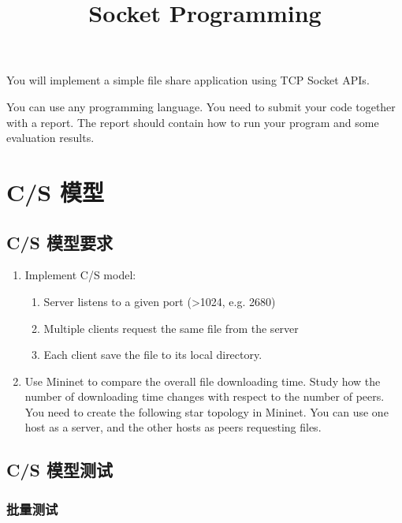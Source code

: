 \endofdump
{}

\title{Socket Programming}
\maketitle
\tableofcontents

\vfill
You will implement a simple file share application using TCP Socket APIs. 

You can use any programming language. You need to submit your code together with a report. The report should contain how to run your program and some evaluation results.
\vfill
\clearpage
\section{C/S 模型}

\subsection{C/S 模型要求}

\begin{enumerate}
    \item Implement C/S model: 
    \begin{enumerate}
        \item Server listens to a given port (>1024, e.g. 2680)
        \item Multiple clients request the same file from the server
        \item Each client save the file to its local directory.
    \end{enumerate}
    \item Use Mininet to compare the overall file downloading time. Study how the number of downloading time changes with respect to the number of peers. You need to create the following star topology in Mininet. You can use one host as a server, and the other hosts as peers requesting files.
    \begin{figure}[H]
        \centering
        
    \end{figure}
\end{enumerate}

\subsection{C/S 模型测试}

\subsubsection{批量测试}


